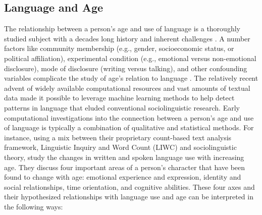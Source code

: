 \subsection{Language and Age}
The relationship between a person's age and use of language is a thoroughly studied subject with a decades long history and inherent challenges \citep{pennebaker2003words, nguyen2014gender, zheng2019personalized}. A number factors like community membership (e.g., gender, socioeconomic status, or political affiliation), experimental condition (e.g., emotional versus non-emotional disclosure), mode of disclosure (writing versus talking), and other confounding variables complicate the study of age's relation to language \citep{nguyen-etal-2011-author}. The relatively recent advent of widely available computational resources and vast amounts of textual data made it possible to leverage machine learning methods to help detect patterns in language that eluded conventional sociolinguistic research. Early computational investigations into the connection between a person's age and use of language is typically a combination of qualitative and statistical methods. For instance, using a mix between their proprietary count-based text analysis framework, Linguistic Inquiry and Word Count (LIWC) and sociolinguistic theory, \cite{pennebaker2003words} study the changes in written and spoken language use with increasing age. They discuss four important areas of a person's character that have been found to change with age: emotional experience and expression, identity and social relationships, time orientation, and cognitive abilities. These four axes and their hypothesized relationships with language use and age can be interpreted in the following ways:
